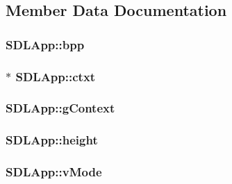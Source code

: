 \subsection{Member Data Documentation}
\hypertarget{class_s_d_l_app_afcefe0414e22f19e20de7df6f4b75d93}{
\subsubsection[{bpp}]{ S\-D\-L\-App\-::bpp}}\label{class_s_d_l_app_afcefe0414e22f19e20de7df6f4b75d93}
\hypertarget{class_s_d_l_app_aa618d890856ef32dd9eb5aaafef71082}{
\subsubsection[{ctxt}]{$\ast$ S\-D\-L\-App\-::ctxt}}\label{class_s_d_l_app_aa618d890856ef32dd9eb5aaafef71082}
\hypertarget{class_s_d_l_app_a81b19177c28e37315c8a6e6b6283fc00}{
\subsubsection[{g\-Context}]{ S\-D\-L\-App\-::g\-Context}}\label{class_s_d_l_app_a81b19177c28e37315c8a6e6b6283fc00}
\hypertarget{class_s_d_l_app_a075d4e09e70ba64c8ec206580e26402c}{
\subsubsection[{height}]{ S\-D\-L\-App\-::height}}\label{class_s_d_l_app_a075d4e09e70ba64c8ec206580e26402c}
\hypertarget{class_s_d_l_app_a66b859368f2d1c4fb00e630b02a588e9}{
\subsubsection[{v\-Mode}]{ S\-D\-L\-App\-::v\-Mode}}\label{class_s_d_l_app_a66b859368f2d1c4fb00e630b02a588e9}
